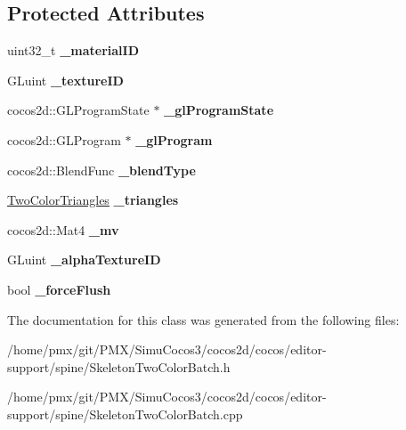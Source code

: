 \subsection*{Protected Attributes}
\begin{DoxyCompactItemize}
\item 
\mbox{\label{classspine_1_1TwoColorTrianglesCommand_ac7abad31a8a9c8a81aa7d33d5f08e311}} 
uint32\+\_\+t {\bfseries \+\_\+material\+ID}
\item 
\mbox{\label{classspine_1_1TwoColorTrianglesCommand_a094bb626bc738c77b02c48cb35bc8e13}} 
G\+Luint {\bfseries \+\_\+texture\+ID}
\item 
\mbox{\label{classspine_1_1TwoColorTrianglesCommand_a0dfb83f558b29d1a84de4eeeee0b6e7e}} 
cocos2d\+::\+G\+L\+Program\+State $\ast$ {\bfseries \+\_\+gl\+Program\+State}
\item 
\mbox{\label{classspine_1_1TwoColorTrianglesCommand_a9c8f50af639f6635db8f99c6dfa3280c}} 
cocos2d\+::\+G\+L\+Program $\ast$ {\bfseries \+\_\+gl\+Program}
\item 
\mbox{\label{classspine_1_1TwoColorTrianglesCommand_aef3f267463299a7a13572d57dc1d2f84}} 
cocos2d\+::\+Blend\+Func {\bfseries \+\_\+blend\+Type}
\item 
\mbox{\label{classspine_1_1TwoColorTrianglesCommand_aec43e784d69bc1abd633216c85724715}} 
\hyperlink{structspine_1_1TwoColorTriangles}{Two\+Color\+Triangles} {\bfseries \+\_\+triangles}
\item 
\mbox{\label{classspine_1_1TwoColorTrianglesCommand_ab291f3d4d1b9420c0b1f52b34f7dbc8d}} 
cocos2d\+::\+Mat4 {\bfseries \+\_\+mv}
\item 
\mbox{\label{classspine_1_1TwoColorTrianglesCommand_ae2d0a4501c199a4c42722b7f06ab8121}} 
G\+Luint {\bfseries \+\_\+alpha\+Texture\+ID}
\item 
\mbox{\label{classspine_1_1TwoColorTrianglesCommand_a91d7b0f5ff8f2e9d7a472b24c96a9957}} 
bool {\bfseries \+\_\+force\+Flush}
\end{DoxyCompactItemize}


The documentation for this class was generated from the following files\+:\begin{DoxyCompactItemize}
\item 
/home/pmx/git/\+P\+M\+X/\+Simu\+Cocos3/cocos2d/cocos/editor-\/support/spine/Skeleton\+Two\+Color\+Batch.\+h\item 
/home/pmx/git/\+P\+M\+X/\+Simu\+Cocos3/cocos2d/cocos/editor-\/support/spine/Skeleton\+Two\+Color\+Batch.\+cpp\end{DoxyCompactItemize}
